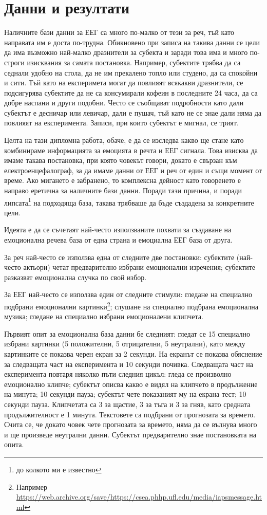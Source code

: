 \documentclass[main.tex]{subfiles}
\begin{document}
\section{Данни и резултати}
Наличните бази данни за ЕЕГ са много по-малко от тези за реч, тъй като направата им е доста по-трудна. Обикновено при записа на такива данни се цели да има възможно най-малко дразнители за субекта и заради това има и много по-строги изисквания за самата постановка. Например, субектите трябва да са седнали удобно на стола, да не им прекалено топло или студено, да са спокойни и сити. Тъй като на експеримета могат да повлияят всякакви дразнители, се подсигурява субектите да не са консумирали кофеин в последните 24 часа, да са добре наспани и други подобни. Често се съобщават подробности като дали субектът е десничар или левичар, дали е пушач, тъй като не се знае дали няма да повлияят на експеримента. Записи, при които субектът е мигнал, се трият.

Целта на тази дипломна работа, обаче, е да се изследва какво ще стане като комбинираме информацията за емоцията в речта и ЕЕГ сигнала. Това изисква да имаме такава постановка, при която човекът говори, докато е свързан към електроенцефалограф, за да имаме данни от ЕЕГ и реч от един и същи момент от време. Ако мигането е забранено, то комплексна дейност като говоренето е направо еретична за наличните бази данни. Поради тази причина, и поради липсата\footnote{до колкото ми е известно} на подходяща база, такава трябваше да бъде създадена за конкретните цели.

Идеята е да се съчетаят най-често използваните похвати за създаване на емоционална речева база от една страна и емоциална ЕЕГ база от друга.

За реч най-често се използва една от следните две постановки: субектите (най-често актьори) четат предварително избрани емоционални изречения; субектите разказват емоционална случка по свой избор.

За ЕЕГ най-често се използва един от следните стимули: гледане на специално подбрани емоционални картинки\footnote{Например \url{https://web.archive.org/save/https://csea.phhp.ufl.edu/media/iapsmessage.html}}; слушане на специално подбрана емоционална музика; гледане на специално избрани емоционалени клипчета.

Първият опит за емоционална база данни бе следният: гледат се 15 специално избрани картинки (5 положителни, 5 отрицателни, 5 неутрални), като между картинките се показва черен екран за 2 секунди. На екранът се показва обяснение за следващата част на експеримента и 10 секунди почивка. Следващата част на експеримента повтаря няколко пъти следния цикъл: гледа се произволно емоционално клипче; субектът описва какво е видял на клипчето в продължение на минута; 10 секунди пауза; субектът чете показаният му на екрана тест; 10 секунди пауза.
Клипчетата са 3 за щастие, 3 за тъга и 3 за гняв, като средната продължителност е 1 минута. Текстовете са подбрани от прогнозата за времето. Счита се, че докато човек чете прогнозата за времето, няма да се вълнува много и ще произведе неутрални данни.
Субектът предварително знае постановката на опита.
\end{document}
